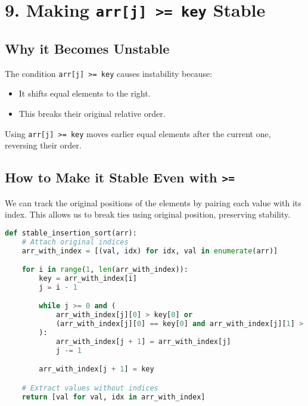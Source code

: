\documentclass[14pt]{extarticle}
\begin{document}
\section*{9. Making \texttt{arr[j] >= key} Stable}

\subsection*{Why it Becomes Unstable}

The condition \texttt{arr[j] >= key} causes instability because:
\begin{itemize}
    \item It shifts equal elements to the right.
    \item This breaks their original relative order.
\end{itemize}

\begin{tcolorbox}[colback=white, colframe=black, title=Stability Violation]
Using \texttt{arr[j] >= key} moves earlier equal elements after the current one, reversing their order.
\end{tcolorbox}

\vspace{1em}

\newpage
\subsection*{How to Make it Stable Even with \texttt{>=}}

We can track the original positions of the elements by pairing each value with its index.  
This allows us to break ties using original position, preserving stability.

\begin{lstlisting}[language=Python, caption=Stable Insertion Sort Using Index Tracking]
def stable_insertion_sort(arr):
    # Attach original indices
    arr_with_index = [(val, idx) for idx, val in enumerate(arr)]

    for i in range(1, len(arr_with_index)):
        key = arr_with_index[i]
        j = i - 1

        while j >= 0 and (
            arr_with_index[j][0] > key[0] or
            (arr_with_index[j][0] == key[0] and arr_with_index[j][1] > key[1])
        ):
            arr_with_index[j + 1] = arr_with_index[j]
            j -= 1

        arr_with_index[j + 1] = key

    # Extract values without indices
    return [val for val, idx in arr_with_index]
\end{lstlisting}
\end{document}
